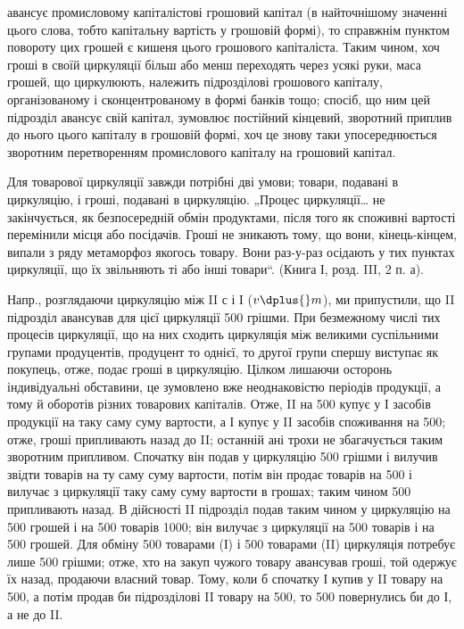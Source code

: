 \parcont{}  %
авансує промисловому капіталістові грошовий капітал (в найточнішому
значенні цього слова, тобто капітальну вартість у грошовій формі), то
справжнім пунктом повороту цих грошей є кишеня цього грошового
капіталіста. Таким чином, хоч гроші в своїй циркуляції більш або менш
переходять через усякі руки, маса грошей, що циркулюють, належить
підрозділові грошового капіталу, організованому і сконцентрованому в
формі банків тощо; спосіб, що ним цей підрозділ авансує свій капітал,
зумовлює постійний кінцевий, зворотний приплив до нього цього капіталу
в грошовій формі, хоч це знову таки упосереднюється зворотним перетворенням
промислового капіталу на грошовий капітал.

Для товарової циркуляції завжди потрібні дві умови; товари, подавані
в циркуляцію, і гроші, подавані в циркуляцію. „Процес циркуляції\dots{} не
закінчується, як безпосередній обмін продуктами, після того як споживні
вартості перемінили місця або посідачів. Гроші не зникають тому, що
вони, кінець-кінцем, випали з ряду метаморфоз якогось товару. Вони раз-у-раз
осідають у тих пунктах циркуляції, що їх звільняють ті або інші
товари“. (Книга І, розд. III, 2 п. а).

Напр., розглядаючи циркуляцію між II $с$ і І ($v \dplus{} m$), ми припустили,
що II підрозділ авансував для цієї циркуляції 500 грішми. При
безмежному числі тих процесів циркуляції, що на них сходить циркуляція
між великими суспільними групами продуцентів, продуцент то
однієї, то другої групи спершу виступає як покупець, отже, подає
гроші в циркуляцію. Цілком лишаючи осторонь індивідуальні обставини,
це зумовлено вже неоднаковістю періодів продукції, а тому й оборотів
різних товарових капіталів. Отже, II на 500 купує у І засобів
продукції на таку саму суму вартости, а І купує у II засобів споживання на
500; отже, гроші припливають назад до II; останній ані трохи
не збагачується таким зворотним припливом. Спочатку він подав у циркуляцію
500 грішми і вилучив звідти товарів на ту саму суму вартости,
потім він продає товарів на 500 і вилучає з циркуляції
таку саму суму вартости в грошах; таким чином 500 припливають
назад. В дійсності II підрозділ подав таким чином у циркуляцію
на 500 грошей і на 500 товарів \deq{} 1000;
він вилучає з циркуляції на 500 товарів і на 500
грошей. Для обміну 500 товарами (І) і 500 товарами
(II) циркуляція потребує лише 500 грішми; отже,
хто на закуп чужого товару авансував гроші, той одержує їх
назад, продаючи власний товар. Тому, коли б спочатку І купив у II
товару на 500, а потім продав би підрозділові II товару на
500, то 500 повернулись би до І, а не до II.

